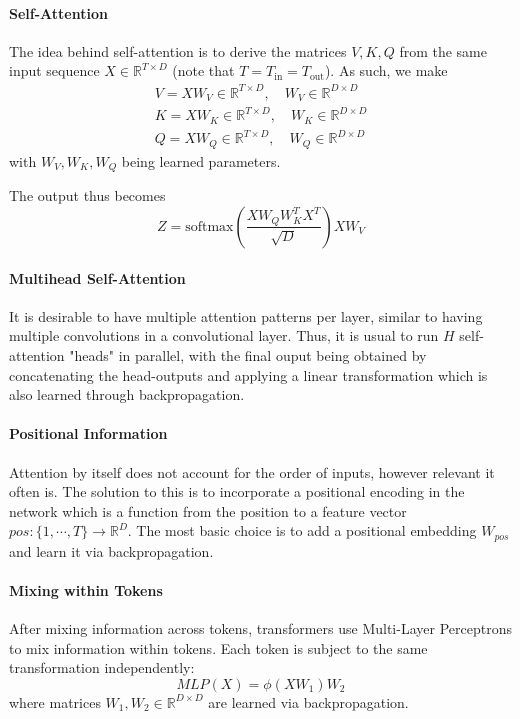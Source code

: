 \documentclass{article}
\newcommand{\R}{\mathbb{R}}
\begin{document}
\paragraph{Self-Attention}

The idea behind self-attention is to derive the matrices $V, K, Q$ from the same input sequence $X \in \R^{T \times D}$ (note that $T = T_\text{in} = T_\text{out}$).
As such, we make 
\begin{gather*}
V = XW_V \in \R^{T \times D}, \quad W_V \in \R^{D \times D} \\
K = XW_K \in \R^{T \times D}, \quad W_K \in \R^{D \times D} \\
Q = XW_Q \in \R^{T \times D}, \quad W_Q \in \R^{D \times D}
\end{gather*}
with $W_V, W_K, W_Q$ being learned parameters.

The output thus becomes
$$
Z = \text{softmax} \left( \frac{X W_Q W_K^T X^T}{\sqrt{D}} \right) X W_V
$$

\paragraph{Multihead Self-Attention}

It is desirable to have multiple attention patterns per layer, similar to having multiple convolutions in a convolutional layer.
Thus, it is usual to run $H$ self-attention "heads" in parallel, with the final ouput being obtained by concatenating the head-outputs and applying a linear transformation which is also learned through backpropagation.

\paragraph{Positional Information}

Attention by itself does not account for the order of inputs, however relevant it often is.
The solution to this is to incorporate a positional encoding in the network which is a function from the position to a feature vector $pos : \{1, \cdots , T\} \to \R^D$.
The most basic choice is to add a positional embedding $W_{pos}$ and learn it via backpropagation.

\paragraph{Mixing within Tokens}

After mixing information across tokens, transformers use Multi-Layer Perceptrons to mix information within tokens.
Each token is subject to the same transformation independently:
$$
MLP(X) = \phi(X W_1) W_2
$$
where matrices $W_1, W_2 \in \R^{D \times D}$ are learned via backpropagation.
\end{document}
